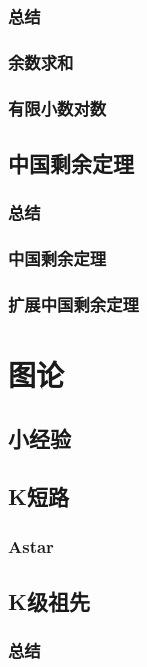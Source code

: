 \documentclass[10pt,a4paper]{article}
\begin{document}
	\subsubsection{总结}
	
	\subsubsection{余数求和}
	
	\subsubsection{有限小数对数}
	
	\subsection{中国剩余定理}
	\subsubsection{总结}
	
	\subsubsection{中国剩余定理}
	
	\subsubsection{扩展中国剩余定理}
	
	\section{图论}
	\subsection{小经验}
	
	\subsection{K短路}
	\subsubsection{Astar}
	
	\subsection{K级祖先}
	\subsubsection{总结}
	
\end{document}
